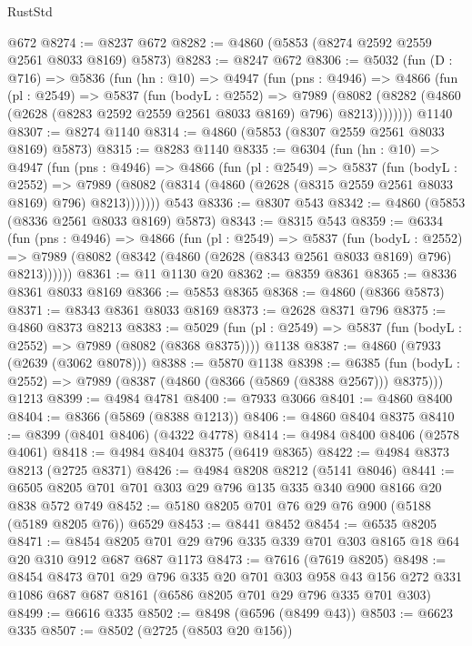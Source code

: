 \begin{lexlean}{RustStd}
\begin{coremodule}
    @672
@8274 := @8237 @672
@8282 := @4860 (@5853 (@8274 @2592 @2559 @2561 @8033 @8169) @5873)
@8283 := @8247 @672
@8306 := @5032
    (fun (D : @716) =>
    @5836
      (fun (hn : @10) =>
      @4947
        (fun (pns : @4946) =>
        @4866
          (fun (pl : @2549) =>
          @5837
            (fun (bodyL : @2552) =>
            @7989
              (@8082 (@8282 (@4860 (@2628 (@8283 @2592 @2559 @2561 @8033 @8169) @796) @8213))))))))
    @1140
@8307 := @8274 @1140
@8314 := @4860 (@5853 (@8307 @2559 @2561 @8033 @8169) @5873)
@8315 := @8283 @1140
@8335 := @6304
    (fun (hn : @10) =>
    @4947
      (fun (pns : @4946) =>
      @4866
        (fun (pl : @2549) =>
        @5837
          (fun (bodyL : @2552) =>
          @7989 (@8082 (@8314 (@4860 (@2628 (@8315 @2559 @2561 @8033 @8169) @796) @8213)))))))
    @543
@8336 := @8307 @543
@8342 := @4860 (@5853 (@8336 @2561 @8033 @8169) @5873)
@8343 := @8315 @543
@8359 := @6334
    (fun (pns : @4946) =>
    @4866
      (fun (pl : @2549) =>
      @5837
        (fun (bodyL : @2552) =>
        @7989 (@8082 (@8342 (@4860 (@2628 (@8343 @2561 @8033 @8169) @796) @8213))))))
@8361 := @11 @1130 @20
@8362 := @8359 @8361
@8365 := @8336 @8361 @8033 @8169
@8366 := @5853 @8365
@8368 := @4860 (@8366 @5873)
@8371 := @8343 @8361 @8033 @8169
@8373 := @2628 @8371 @796
@8375 := @4860 @8373 @8213
@8383 := @5029
    (fun (pl : @2549) => @5837 (fun (bodyL : @2552) => @7989 (@8082 (@8368 @8375))))
    @1138
@8387 := @4860 (@7933 (@2639 (@3062 @8078)))
@8388 := @5870 @1138
@8398 := @6385
    (fun (bodyL : @2552) => @7989 (@8387 (@4860 (@8366 (@5869 (@8388 @2567))) @8375)))
    @1213
@8399 := @4984 @4781
@8400 := @7933 @3066
@8401 := @4860 @8400
@8404 := @8366 (@5869 (@8388 @1213))
@8406 := @4860 @8404 @8375
@8410 := @8399 (@8401 @8406) (@4322 @4778)
@8414 := @4984 @8400 @8406 (@2578 @4061)
@8418 := @4984 @8404 @8375 (@6419 @8365)
@8422 := @4984 @8373 @8213 (@2725 @8371)
@8426 := @4984 @8208 @8212 (@5141 @8046)
@8441 := @6505 @8205 @701 @701 @303 @29 @796 @135 @335 @340 @900 @8166 @20 @838 @572 @749
@8452 := @5180 @8205 @701 @76 @29 @76 @900 (@5188 (@5189 @8205 @76)) @6529
@8453 := @8441 @8452
@8454 := @6535 @8205
@8471 := @8454 @8205 @701 @29 @796 @335 @339 @701 @303 @8165 @18 @64 @20 @310 @912 @687 @687 @1173
@8473 := @7616 (@7619 @8205)
@8498 := @8454
    @8473
    @701
    @29
    @796
    @335
    @20
    @701
    @303
    @958
    @43
    @156
    @272
    @331
    @1086
    @687
    @687
    @8161
    (@6586 @8205 @701 @29 @796 @335 @701 @303)
@8499 := @6616 @335
@8502 := @8498 (@6596 (@8499 @43))
@8503 := @6623 @335
@8507 := @8502 (@2725 (@8503 @20 @156))

\end{coremodule}
\end{lexlean}
